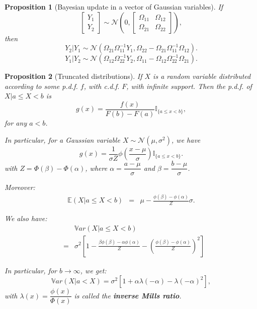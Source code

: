 \documentclass[
  11pt,
]{book}
\newtheorem{proposition}{Proposition}[chapter]
\theoremstyle{definition}
\theoremstyle{definition}
\theoremstyle{definition}
\theoremstyle{definition}
\theoremstyle{remark}
\begin{document}
\begin{proposition}[Bayesian update in a vector of Gaussian variables]
\protect\hypertarget{prp:update}{}\label{prp:update}If
\[
\left[
\begin{array}{c}
Y_1\\
Y_2
\end{array}
\right]
\sim \mathcal{N}
\left(0,
\left[\begin{array}{cc}
\Omega_{11} & \Omega_{12}\\
\Omega_{21} & \Omega_{22}
\end{array}\right]
\right),
\]
then
\[
Y_{2}|Y_{1} \sim \mathcal{N}
\left(
\Omega_{21}\Omega_{11}^{-1}Y_{1},\Omega_{22}-\Omega_{21}\Omega_{11}^{-1}\Omega_{12}
\right).
\]
\[
Y_{1}|Y_{2} \sim \mathcal{N}
\left(
\Omega_{12}\Omega_{22}^{-1}Y_{2},\Omega_{11}-\Omega_{12}\Omega_{22}^{-1}\Omega_{21}
\right).
\]
\end{proposition}

\begin{proposition}[Truncated distributions]
\protect\hypertarget{prp:truncated}{}\label{prp:truncated}If \(X\) is a random variable distributed according to some p.d.f. \(f\), with c.d.f. \(F\), with infinite support. Then the p.d.f. of \(X|a \le X < b\) is
\[
g(x) = \frac{f(x)}{F(b)-F(a)}\mathbb{I}_{\{a \le x < b\}},
\]
for any \(a<b\).

In particular, for a Gaussian variable \(X \sim \mathcal{N}(\mu,\sigma^2)\), we have
\[
g(x) = \frac{1}{\sigma Z}\phi\left(\frac{x-\mu}{\sigma}\right)\mathbb I_{\{a\le x<b\}}.
\]
with \(Z = \Phi(\beta)-\Phi(\alpha)\), where \(\alpha = \dfrac{a - \mu}{\sigma}\) and \(\beta = \dfrac{b - \mu}{\sigma}\).

Moreover:
\begin{eqnarray}
\mathbb{E}(X|a\le X<b) &=& \mu - \frac{\phi\left(\beta\right)-\phi\left(\alpha\right)}{Z}\sigma. \label{eq:Etrunc}
\end{eqnarray}

We also have:
\begin{eqnarray}
&& \mathbb{V}ar(X|a\le X<b) \nonumber\\
&=& \sigma^2\left[
1 -  \frac{\beta\phi\left(\beta\right)-\alpha\phi\left(\alpha\right)}{Z} -  \left(\frac{\phi\left(\beta\right)-\phi\left(\alpha\right)}{Z}\right)^2 \right] \label{eq:Vtrunc}
\end{eqnarray}

In particular, for \(b \rightarrow \infty\), we get:
\begin{equation}
\mathbb{V}ar(X|a < X) = \sigma^2\left[1 + \alpha\lambda(-\alpha) - \lambda(-\alpha)^2 \right], \label{eq:Vtrunc2}
\end{equation}
with \(\lambda(x)=\dfrac{\phi(x)}{\Phi(x)}\) is called the \textbf{inverse Mills ratio}.
\end{proposition}
\end{document}
